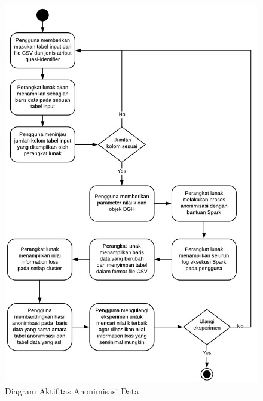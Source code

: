 \documentclass[a4paper,twoside]{article}
\begin{document}
\begin{enumerate}
\newpage
\begin{figure}[H]
	\centering
	\includegraphics[scale=0.8]{pl_anonimisasi}
	\caption{Diagram Aktifitas Anonimisasi Data}
	\label{fig:pl_anonimisasi}
\end{figure}


\end{enumerate}
\end{document}
